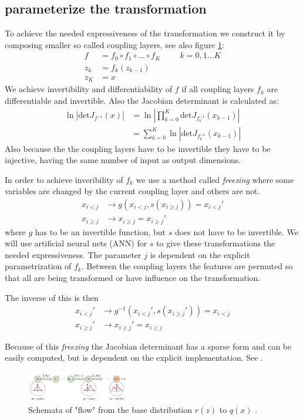 \documentclass[%
 reprint,
 amsmath,amssymb,
 aps,
]{revtex4-2}
\begin{document}
\subsection{parameterize the transformation}
\label{sec:param trafo}
To achieve the needed expressiveness of the transformation we construct it by composing smaller so called coupling layers, see also figure \ref{fig:schemaFlow}:
\begin{align*}
	f &= f_0 \circ f_1 \circ ... \circ f_K \hspace{1cm} k=0,1...K \\
	z_k &= f_k(z_{k-1})\\
	z_K &= x
\end{align*}
We achieve invertibility and differentiability of $f$ if all coupling layers $f_k$ are differentiable and invertible. Also the Jacobian determinant is calculated as:
\begin{align*}
	\ln\left|\text{det}J_{f^{-1}}(x)\right| &= \ln\left|\prod_{k=0}^{K}\text{det}J_{f_{k}^{-1}}(x_{k-1})\right| \\
	&= \sum_{k=0}^{K}\ln\left|\text{det}J_{f_{k}^{-1}}(x_{k-1})\right|
\end{align*}
Also because the the coupling layers have to be invertible they have to be injective, having the same number of input as output dimensions. 

In order to achieve inveribility of $f_k$ we use a method called \textit{freezing} where some variables are changed by the current coupling layer and others are not. 
\begin{align*}
	x_{i<j} &\rightarrow g(x_{i<j},s(x_{i\geq j})) = 	x_{i<j}'\\
	x_{i\geq j} &\rightarrow x_{i\geq j} = x_{i\geq j}'
\end{align*}
where $g$ has to be an invertible function, but $s$ does not have to be invertible. We will use artificial neural nets (ANN) for $s$ to give these transformations the needed expressiveness. The parameter $j$ is dependent on the explicit parametrization of $f_k$. Between the coupling layers the features are permuted so that all are being transformed or have influence on the transformation.

The inverse of this is then
\begin{align*}
	x_{i<j}' &\rightarrow g^{-1}(x_{i<j}',s(x_{i\geq j}')) = x_{i<j}\\
	x_{i\geq j}' &\rightarrow x_{i\geq j}' = x_{i\geq j}
\end{align*}

Because of this \textit{freezing} the Jacobian determinant has a sparse form and can be easily computed, but is dependent on the explicit implementation. See \cite{JMLR:v22:19-1028}.
 \begin{figure}[h]
	\centering
	\includegraphics[width=0.4\textwidth]{figs/normalizing_flow_layout.png}
	\caption{ Schemata of "flow" from the base distribution $r(z)$ to $q(x)$
		\label{fig:schemaFlow}. \cite{nfSchema}
	}
\end{figure}
\end{document}
